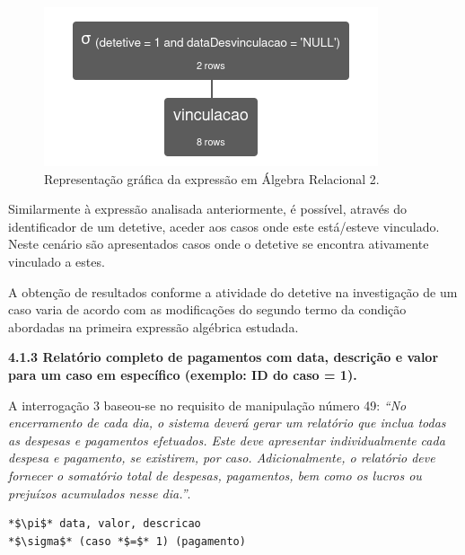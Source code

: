 \documentclass[a4paper,12pt]{scrreprt}
\begin{document}
\begin{figure}[!ht]
    \centering
    \includegraphics[scale=0.9]{images/relax/2.png}
    \caption{Representação gráfica da expressão em Álgebra Relacional 2.}
\end{figure}
\vspace{0.2cm}

Similarmente à expressão analisada anteriormente, é possível, através do identificador de um detetive, aceder aos casos onde este está/esteve vinculado. Neste cenário são apresentados casos onde o detetive se encontra ativamente vinculado a estes.

A obtenção de resultados conforme a atividade do detetive na investigação de um caso varia de acordo com as modificações do segundo termo da condição abordadas na primeira expressão algébrica estudada.

\clearpage %
{\large\textbf{4.1.3 Relatório completo de pagamentos com data, descrição e valor para um caso em específico (exemplo: ID do caso = 1).}}

\vspace{0.2cm}

A interrogação 3 baseou-se no requisito de manipulação número 49: \textit{“No encerramento de cada dia, o sistema deverá gerar um relatório que inclua todas as despesas e pagamentos efetuados. Este deve apresentar individualmente cada despesa e pagamento, se existirem, por caso. Adicionalmente, o relatório deve fornecer o somatório total de despesas, pagamentos, bem como os lucros ou prejuízos acumulados nesse dia.”}.

\vspace{0.2cm}

\begin{lstlisting}[escapechar=*]
*$\pi$* data, valor, descricao
*$\sigma$* (caso *$=$* 1) (pagamento)
\end{lstlisting}
\end{document}
